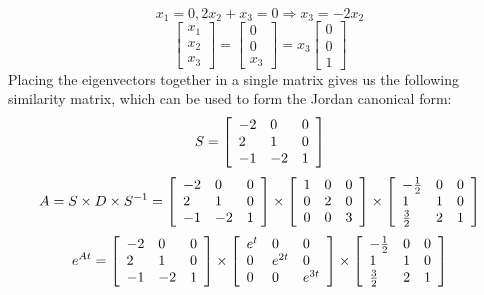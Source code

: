 \documentclass[12pt,letterpaper,reqno]{amsart}
\begin{document}
\begin{enumerate}
\begin{enumerate}
\begin{flushleft}
    $$x_1 = 0, 2x_2 + x_3 = 0 \Rightarrow x_3 = -2x_2$$
    $$\left[ \begin{array} { l } { x_1 } \\ { x_2 } \\ { x_3 } \end{array} \right] = \left[ \begin{array} { l } { 0 } \\ { 0 } \\ { x_3 } \end{array} \right] = x_3 \left[ \begin{array} { l } { 0 } \\ { 0 } \\ { 1 } \end{array} \right]$$
    Placing the eigenvectors together in a single matrix gives us the following similarity matrix, which can be used to form the Jordan canonical form:
    $$S = \left[ \begin{array} { l l l } { -2 } & { 0 } & { 0 } \\ { 2 } & { 1 } & { 0 } \\ { -1 } & { -2 } & { 1 } \end{array} \right]$$
    $$A = S\times D\times S^{-1} = \left[ \begin{array} { l l l } { -2 } & { 0 } & { 0 } \\ { 2 } & { 1 } & { 0 } \\ { -1 } & { -2 } & { 1 } \end{array} \right] \times \left[ \begin{array} { l l l } { 1 } & { 0 } & { 0 } \\ { 0 } & { 2 } & { 0 } \\ { 0 } & { 0 } & { 3 } \end{array} \right] \times \left[ \begin{array} { l l l } { -\frac{1}{2} } & { 0 } & { 0 } \\ { 1 } & { 1 } & { 0 } \\ { \frac{3}{2} } & { 2 } & { 1 } \end{array} \right]$$
    $$e^{A t} = \left[ \begin{array} { l l l } { -2 } & { 0 } & { 0 } \\ { 2 } & { 1 } & { 0 } \\ { -1 } & { -2 } & { 1 } \end{array} \right] \times \left[ \begin{array} { l l l } { e^t } & { 0 } & { 0 } \\ { 0 } & { e^{2t}} & { 0 } \\ { 0 } & { 0 } & { e^{3t}} \end{array} \right] \times \left[ \begin{array} { l l l } { -\frac{1}{2} } & { 0 } & { 0 } \\ { 1 } & { 1 } & { 0 } \\ { \frac{3}{2} } & { 2 } & { 1 } \end{array} \right]$$

\end{flushleft}
\end{enumerate}
\end{enumerate}
\end{document}
